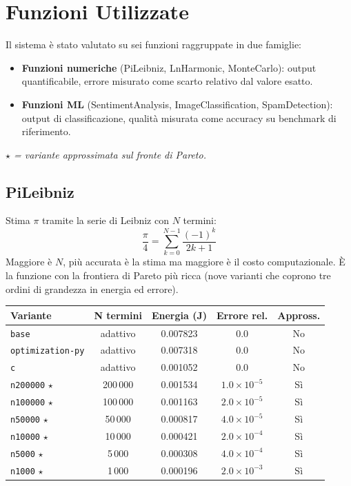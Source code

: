 \documentclass[a4paper,11pt]{article}
\begin{document}
\section{Funzioni Utilizzate}

Il sistema è stato valutato su sei funzioni raggruppate in due famiglie:

\begin{itemize}
  \item \textbf{Funzioni numeriche} (PiLeibniz, LnHarmonic, MonteCarlo): output
    quantificabile, errore misurato come scarto relativo dal valore esatto.
  \item \textbf{Funzioni ML} (SentimentAnalysis, ImageClassification, SpamDetection):
    output di classificazione, qualità misurata come accuracy su benchmark di
    riferimento.
\end{itemize}

\noindent\textit{$\star$ = variante approssimata sul fronte di Pareto.}

\subsection{PiLeibniz}

Stima $\pi$ tramite la serie di Leibniz con $N$ termini:
\[
  \frac{\pi}{4} = \sum_{k=0}^{N-1} \frac{(-1)^k}{2k+1}
\]
Maggiore è $N$, più accurata è la stima ma maggiore è il costo computazionale.
È la funzione con la frontiera di Pareto più ricca (nove varianti che coprono tre ordini
di grandezza in energia ed errore).

\begin{table}[h!]
\centering
\small
\begin{tabular}{lcccc}
\toprule
\textbf{Variante} & \textbf{N termini} & \textbf{Energia (J)} &
\textbf{Errore rel.} & \textbf{Appross.} \\
\midrule
\texttt{base}          & adattivo & 0.007823 & $0.0$              & No \\
\texttt{optimization-py} & adattivo & 0.007318 & $0.0$            & No \\
\texttt{c}             & adattivo & 0.001052 & $0.0$              & No \\
\texttt{n200000} $\star$ & 200\,000 & 0.001534 & $1.0\times10^{-5}$ & Sì \\
\texttt{n100000} $\star$ & 100\,000 & 0.001163 & $2.0\times10^{-5}$ & Sì \\
\texttt{n50000}  $\star$ &  50\,000 & 0.000817 & $4.0\times10^{-5}$ & Sì \\
\texttt{n10000}  $\star$ &  10\,000 & 0.000421 & $2.0\times10^{-4}$ & Sì \\
\texttt{n5000}   $\star$ &   5\,000 & 0.000308 & $4.0\times10^{-4}$ & Sì \\
\texttt{n1000}   $\star$ &   1\,000 & 0.000196 & $2.0\times10^{-3}$ & Sì \\
\bottomrule
\end{tabular}
\end{table}
\end{document}
